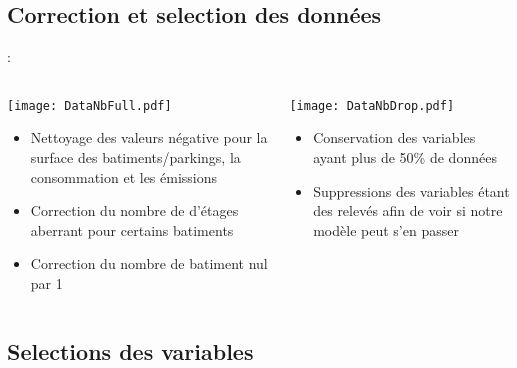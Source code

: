 \documentclass[8pt,aspectratio=169,hyperref={unicode=true}]{beamer}
\begin{document}
\subsection{Correction et selection des données}
\begin{frame}{\insertsection : \insertsubsection}
  \begin{columns}[t]
    \begin{column}{.5\textwidth}
      \texttt{[image: DataNbFull.pdf]}
      \begin{itemize}
        \item Nettoyage des valeurs négative pour la surface des batiments/parkings,
              la consommation et les émissions
        \item Correction du nombre de d'étages aberrant pour certains batiments
        \item Correction du nombre de batiment nul par 1
      \end{itemize}
    \end{column}
    \begin{column}{.5\textwidth}
      \texttt{[image: DataNbDrop.pdf]}
      \begin{itemize}
        \item Conservation des variables ayant plus de 50\% de données
        \item Suppressions des variables étant des relevés afin de voir si notre modèle
              peut s'en passer
      \end{itemize}
    \end{column}
  \end{columns}
\end{frame}

\subsection{Selections des variables}
\end{document}

